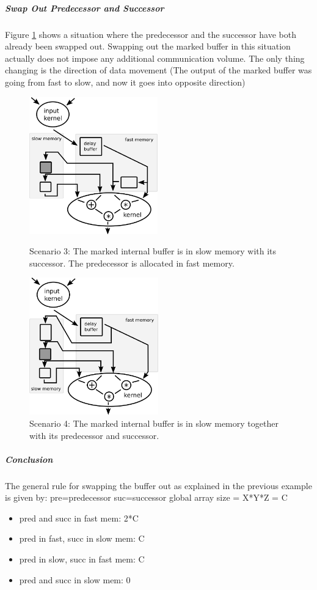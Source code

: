 \subparagraph{Swap Out Predecessor and Successor}
Figure \ref{fig:optimizer-prev-main-succ-slow-memory} shows a situation where the predecessor and the successor have both already been swapped out. Swapping out the marked buffer in this situation actually does not impose any additional communication volume. The only thing changing is the direction of data movement (The output of the marked buffer was going from fast to slow, and now it goes into opposite direction)  
\begin{figure}[h]
	\begin{minipage}{.5\columnwidth}
		\centering
		\includegraphics[height=16em]{drawings/optimizer-main-succ-slow-memory.png}
		\caption{Scenario 3: The marked internal buffer is in slow memory with its successor. The predecessor is allocated in fast memory.}
		\label{fig:optimizer-main-succ-slow-memory}
	\end{minipage}
	\begin{minipage}{.5\columnwidth}
		\centering
		\includegraphics[height=16em]{drawings/optimizer-prev-main-succ-slow-memory.png}
		\caption{Scenario 4: The marked internal buffer is in slow memory together with its predecessor and successor.}
		\label{fig:optimizer-prev-main-succ-slow-memory}
	\end{minipage}
\end{figure}


\subparagraph{Conclusion}
The general rule for swapping the buffer out as explained in the previous example is given by: 
pre=predecessor
suc=successor
global array size = X*Y*Z = C
\begin{itemize}
	\item pred and succ in fast mem: 2*C
	\item pred in fast, succ in slow mem: C
	\item pred in slow, succ in fast mem: C
	\item pred and succ in slow mem: 0
\end{itemize}

